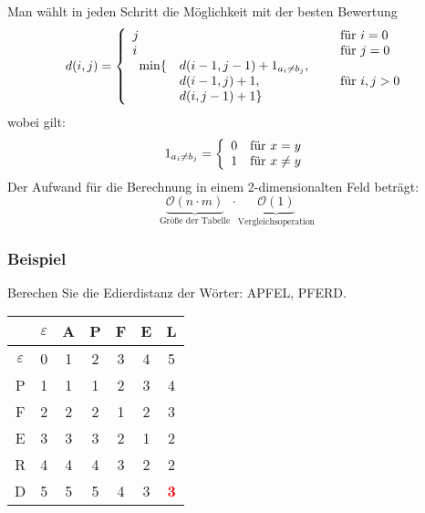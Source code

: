 Man wählt in jeden Schritt die Möglichkeit mit der besten Bewertung
\begin{equation*}
d(i,j) = \left\{
	\begin{array}{l l}
		j & \quad \text{für } i=0\\
		i & \quad \text{für } j=0\\
		\begin{array}{l l}
			\min \{&d(i-1,j-1) + 1_{a_{i} \neq b_{j}},\\
			&d(i-1,j) + 1,\\
			&d(i,j-1) + 1 \}
		\end{array} & \quad \text{für } i,j >0
  \end{array} \right.
\end{equation*}
wobei gilt:
\begin{equation*}
	  1_{a_{i} \neq b_{j}} = \left\{
	\begin{array}{l l}
		0 & \text{für } x = y \\
		1 & \text{für } x \neq y
	\end{array}
	\right.
\end{equation*}
Der Aufwand für die Berechnung in einem 2-dimensionalten Feld beträgt:
\begin{equation*}
	\underbrace{\mathcal{O}(n \cdot m)}_{\textrm{Größe der Tabelle}} \cdot \underbrace{\mathcal{O}(1)}_{\textrm{Vergleichsoperation}}
\end{equation*}

\subsubsection{Beispiel}
Berechen Sie die Edierdistanz der Wörter: APFEL, PFERD.
\begin{center}
	\begin{tabular}{c|cccccc}
		& \(\varepsilon\) & A & P & F & E & L \\ \hline
	\(\varepsilon\)		& 0 & 1 & 2 & 3 & 4 & 5 \\
	P	& 1 & 1 & 1 & 2 & 3 & 4 \\
	F	& 2 & 2 & 2 & 1 & 2 & 3 \\
	E	& 3 & 3 & 3 & 2 & 1 & 2 \\
	R	& 4 & 4 & 4 & 3 & 2 & 2 \\
	D	& 5 & 5 & 5 & 4 & 3 & \textbf{\textcolor{red}{3}}
	\end{tabular}
\end{center}

